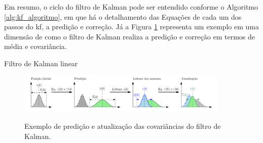 \documentclass[acronym, symbols, table, deposito]{fei}
\begin{document}
				Em resumo, o ciclo do filtro de Kalman pode ser entendido conforme o Algoritmo \ref{alg:kf_algoritmo}, em que há o detalhamento das Equações de cada um dos passos do \acrshort{kf}, a predição e correção. Já a Figura \ref{fig:exemplo_filtro_de_kalman_covariancias} representa um exemplo em uma dimensão de como o filtro de Kalman realiza a predição e correção em termos de média e covariância.
				

				\begin{algorithm}
					\caption{Filtro de Kalman linear}\label{alg:kf_algoritmo}
				\end{algorithm}
			
				\begin{figure}[!htb]
					\centering
					\caption{Exemplo de predição e atualização das covariâncias do filtro de Kalman.}
					\includegraphics[width=0.9\textwidth]{exemplo_filtro_de_kalman.png}
					\label{fig:exemplo_filtro_de_kalman_covariancias}
				\end{figure}
		
\end{document}
